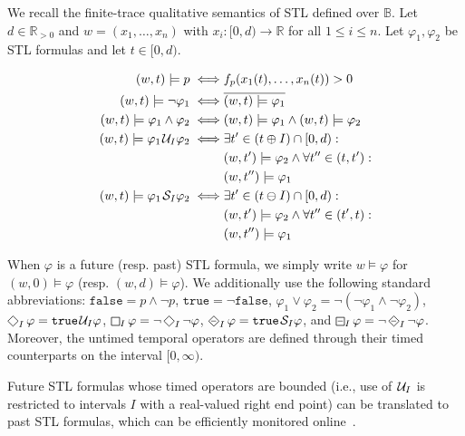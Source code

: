 \documentclass[iicol,lineno]{sn-jnl}
\newcommand{\true}{\texttt{true}}
\newcommand{\false}{\texttt{false}}
\newcommand{\R}{\mathbb{R}}
\newcommand{\B}{\mathbb{B}}
\renewcommand{\LTLf}{\LTLdiamond}
\renewcommand{\LTLg}{\LTLsquare}
\def\until{\kern.1em\mathcal{U}}
\def\since{\kern.1em\mathcal{S}}
\newcommand{\?}{\text{?}}
\begin{document}
	We recall the finite-trace qualitative semantics of STL defined over $\B$.
	Let $d \in \R_{> 0}$ and $w = (x_1, \ldots, x_n)$ with $x_i : [0,d) \to \R$ for all $1 \leq i \leq n$.
	Let $\varphi_1, \varphi_2$ be STL formulas and let $t \in [0,d)$.
	
	\bgroup \color{red}
	\begin{align*}
		(w,t) \models p \iff & f_p(x_1(t), \ldots, x_n(t)) > 0 \\
		(w,t) \models \lnot \varphi_1 \iff & \overline{(w,t) \models \varphi_1} \\
		(w,t) \models \varphi_1 \land \varphi_2 \iff & (w,t) \models \varphi_1 \land (w,t) \models \varphi_2 \\
		(w,t) \models \varphi_1 \until_I \varphi_2 \iff & \exists t' \in (t \oplus I) \cap [0,d) :  \\
		& (w,t') \models \varphi_2 \land \forall t'' \in (t, t') : \\
		& (w,t'') \models \varphi_1\\
		(w,t) \models \varphi_1 \since_I \varphi_2 \iff & \exists t' \in (t \ominus I) \cap [0,d) :  \\
		& (w,t') \models \varphi_2 \land \forall t'' \in (t', t) : \\
		& (w,t'') \models \varphi_1
	\end{align*}
	
	When $\varphi$ is a future (resp. past) STL formula, we simply write $w \models \varphi$ for $(w,0) \models \varphi$ (resp. $(w,d) \models \varphi$).
	We additionally use the following standard abbreviations: 
	$\false = p \land \lnot p$,
	$\true = \lnot \false$,
	$ \varphi_1 \lor \varphi_2 = \lnot (\lnot \varphi_1 \land \lnot \varphi_2)$,
	$\LTLf_I \varphi = \true \until_I \varphi$,
	$\LTLg_I \varphi = \lnot \LTLf_I \lnot \varphi$,
	$\LTLdiamondminus_I \varphi = \true \since_I \varphi$, and
	$\LTLsquareminus_I \varphi = \lnot \LTLdiamondminus_I \lnot \varphi$.
	Moreover, the untimed temporal operators are defined through their timed counterparts on the interval $[0,\infty)$.
	
	Future STL formulas whose timed operators are bounded (i.e., use of $\until_I$ is restricted to intervals $I$ with a real-valued right end point) can be translated to past STL formulas, which can be efficiently monitored online~\cite{MalerNP07,JaksicBGKNN15,Gol18}.
	\egroup
	
\end{document}
